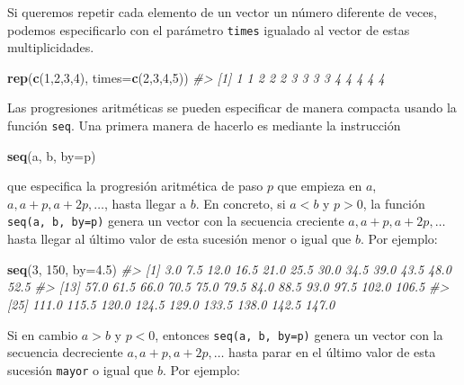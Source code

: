 \documentclass[
]{book}
\newenvironment{Shaded}{\begin{snugshade}}{\end{snugshade}}
\newcommand{\CommentTok}[1]{\textcolor[rgb]{0.56,0.35,0.01}{\textit{#1}}}
\newcommand{\DataTypeTok}[1]{\textcolor[rgb]{0.13,0.29,0.53}{#1}}
\newcommand{\DecValTok}[1]{\textcolor[rgb]{0.00,0.00,0.81}{#1}}
\newcommand{\FloatTok}[1]{\textcolor[rgb]{0.00,0.00,0.81}{#1}}
\newcommand{\KeywordTok}[1]{\textcolor[rgb]{0.13,0.29,0.53}{\textbf{#1}}}
\newcommand{\NormalTok}[1]{#1}
\theoremstyle{definition}
\theoremstyle{definition}
\theoremstyle{definition}
\theoremstyle{remark}
\begin{document}
Si queremos repetir cada elemento de un vector un número diferente de veces, podemos especificarlo con el parámetro \texttt{times} igualado al vector de estas multiplicidades.

\begin{Shaded}
\begin{Highlighting}[]
\KeywordTok{rep}\NormalTok{(}\KeywordTok{c}\NormalTok{(}\DecValTok{1}\NormalTok{,}\DecValTok{2}\NormalTok{,}\DecValTok{3}\NormalTok{,}\DecValTok{4}\NormalTok{), }\DataTypeTok{times=}\KeywordTok{c}\NormalTok{(}\DecValTok{2}\NormalTok{,}\DecValTok{3}\NormalTok{,}\DecValTok{4}\NormalTok{,}\DecValTok{5}\NormalTok{)) }
\CommentTok{\#\textgreater{}  [1] 1 1 2 2 2 3 3 3 3 4 4 4 4 4}
\end{Highlighting}
\end{Shaded}

Las progresiones aritméticas se pueden especificar de manera compacta usando la función \texttt{seq}. Una primera manera de hacerlo es mediante la instrucción

\begin{Shaded}
\begin{Highlighting}[]
\KeywordTok{seq}\NormalTok{(a, b, }\DataTypeTok{by=}\NormalTok{p)}
\end{Highlighting}
\end{Shaded}

que especifica la progresión aritmética de paso \(p\) que empieza en \(a\),
\(a, a+p, a+2p, \ldots\), hasta llegar a \(b\). En concreto, si \(a<b\) y \(p>0\), la función \texttt{seq(a,\ b,\ by=p)} genera un vector con la secuencia creciente
\(a,a+p,a+2p,\ldots\) hasta llegar al último valor de esta sucesión menor o igual que \(b\). Por ejemplo:

\begin{Shaded}
\begin{Highlighting}[]
\KeywordTok{seq}\NormalTok{(}\DecValTok{3}\NormalTok{, }\DecValTok{150}\NormalTok{, }\DataTypeTok{by=}\FloatTok{4.5}\NormalTok{)}
\CommentTok{\#\textgreater{}  [1]   3.0   7.5  12.0  16.5  21.0  25.5  30.0  34.5  39.0  43.5  48.0  52.5}
\CommentTok{\#\textgreater{} [13]  57.0  61.5  66.0  70.5  75.0  79.5  84.0  88.5  93.0  97.5 102.0 106.5}
\CommentTok{\#\textgreater{} [25] 111.0 115.5 120.0 124.5 129.0 133.5 138.0 142.5 147.0}
\end{Highlighting}
\end{Shaded}

Si en cambio \(a>b\) y \(p<0\), entonces \texttt{seq(a,\ b,\ by=p)} genera un vector con la secuencia decreciente \(a,a+p, a+2p, \ldots\)
hasta parar en el último valor de esta sucesión \texttt{mayor} o igual que \(b\). Por ejemplo:
\end{document}
